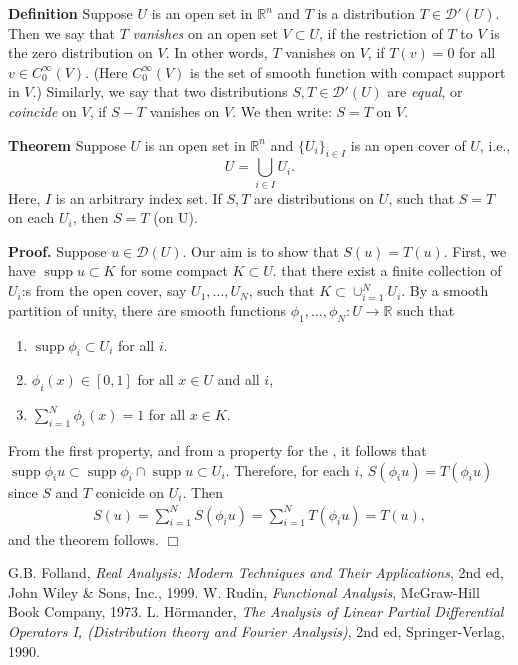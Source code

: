 \documentclass[12pt]{article}
\newcommand{\sR}[0]{\mathbb{R}}
\begin{document}

\newcommand{\supp}[0]{\operatorname{supp}}
\newcommand{\cD}[0]{\mathcal{D}}

{\bf Definition}
Suppose $U$ is an open set in $\sR^n$ and $T$ is a 
distribution $T\in \cD'(U)$. Then we say that $T$ \emph{vanishes} on
an open set $V\subset U$, if the restriction of $T$ to $V$ is 
the zero distribution on $V$. In other words, $T$ vanishes on $V$, if
$T(v)=0$ for all $v\in C_0^\infty(V)$. (Here $C_0^\infty(V)$ is the set
of smooth function with compact support in $V$.) Similarly, we say that
two distributions $S,T\in \cD'(U)$ are \emph{equal}, or 
\emph{coincide} on $V$, if $S-T$ vanishes on $V$. We then 
write: $S=T$ on $V$. 

{\bf Theorem}\cite{folland, hormander} 
Suppose $U$ is an open set in $\sR^n$ and 
$\{U_i\}_{i\in I}$ is an open cover of $U$, i.e., 
$$U=\bigcup_{i\in I} U_i.$$
Here, $I$ is an arbitrary index set. If $S,T$ are distributions on $U$, 
such that $S=T$ on each $U_i$, then $S=T$ (on U). 

{\bf Proof.} Suppose $u\in \cD(U)$. Our aim is to show that $S(u)=T(u)$. 
First, we have $\supp u \subset K$ for some compact $K\subset U$. 
 that there exist a finite collection of $U_i$:s from the open cover, 
say $U_1, \ldots, U_N$, such that $K\subset \cup_{i=1}^N U_i$.
By a smooth partition of unity, there
are smooth functions $\phi_1, \ldots, \phi_N: U\to \sR$ such that
\begin{enumerate}
\item$ \supp \phi_i \subset U_i$ for all $i$.
\item  $\phi_i(x) \in [0,1]$ for all $x\in U$ and all $i$,
\item $\sum_{i=1}^N \phi_i(x) = 1$ for all $x\in K$.
\end{enumerate}
From the first property, and from a property for the ,
it follows that 
$\supp \phi_i u \subset \supp \phi_i \cap \supp u \subset U_i$. 
Therefore,  for each $i$,
$S(\phi_i u)=T(\phi_i u)$ since $S$ and $T$ conicide 
on $U_i$. 
Then
\begin{eqnarray*}
S(u) = \sum_{i=1}^N S(\phi_i u) = \sum_{i=1}^N T(\phi_i u) = T(u),
\end{eqnarray*}
and the theorem follows. $\Box$

\begin{thebibliography}{9}
 G.B. Folland, \emph{Real Analysis: Modern Techniques and Their Applications}, 2nd ed, John Wiley \& Sons, Inc., 1999.
 W. Rudin, \emph{Functional Analysis},
 McGraw-Hill Book Company, 1973.
 L. H\"ormander, \emph{The Analysis of Linear Partial Differential Operators I,
 (Distribution theory and Fourier Analysis)}, 2nd ed, Springer-Verlag, 1990.
 \end{thebibliography}
\end{document}
